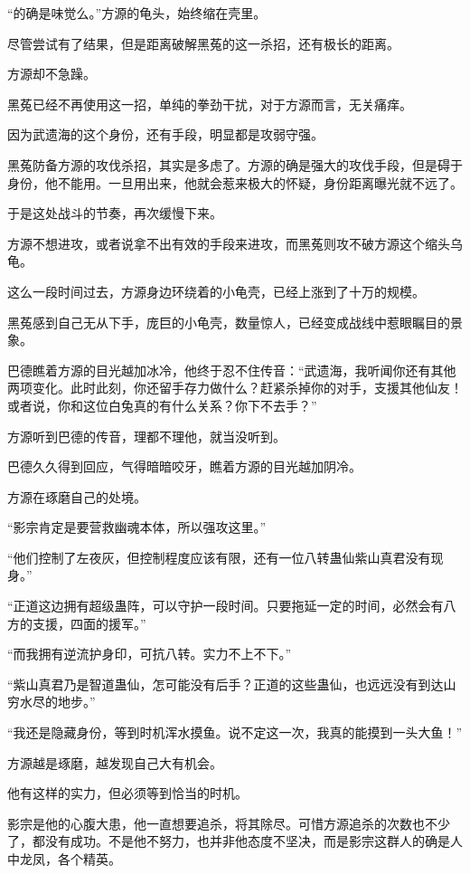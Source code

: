 \begin{this_body}
“的确是味觉么。”方源的龟头，始终缩在壳里。

尽管尝试有了结果，但是距离破解黑菟的这一杀招，还有极长的距离。

方源却不急躁。

黑菟已经不再使用这一招，单纯的拳劲干扰，对于方源而言，无关痛痒。

因为武遗海的这个身份，还有手段，明显都是攻弱守强。

黑菟防备方源的攻伐杀招，其实是多虑了。方源的确是强大的攻伐手段，但是碍于身份，他不能用。一旦用出来，他就会惹来极大的怀疑，身份距离曝光就不远了。

于是这处战斗的节奏，再次缓慢下来。

方源不想进攻，或者说拿不出有效的手段来进攻，而黑菟则攻不破方源这个缩头乌龟。

这么一段时间过去，方源身边环绕着的小龟壳，已经上涨到了十万的规模。

黑菟感到自己无从下手，庞巨的小龟壳，数量惊人，已经变成战线中惹眼瞩目的景象。

巴德瞧着方源的目光越加冰冷，他终于忍不住传音：“武遗海，我听闻你还有其他两项变化。此时此刻，你还留手存力做什么？赶紧杀掉你的对手，支援其他仙友！或者说，你和这位白兔真的有什么关系？你下不去手？”

方源听到巴德的传音，理都不理他，就当没听到。

巴德久久得到回应，气得暗暗咬牙，瞧着方源的目光越加阴冷。

方源在琢磨自己的处境。

“影宗肯定是要营救幽魂本体，所以强攻这里。”

“他们控制了左夜灰，但控制程度应该有限，还有一位八转蛊仙紫山真君没有现身。”

“正道这边拥有超级蛊阵，可以守护一段时间。只要拖延一定的时间，必然会有八方的支援，四面的援军。”

“而我拥有逆流护身印，可抗八转。实力不上不下。”

“紫山真君乃是智道蛊仙，怎可能没有后手？正道的这些蛊仙，也远远没有到达山穷水尽的地步。”

“我还是隐藏身份，等到时机浑水摸鱼。说不定这一次，我真的能摸到一头大鱼！”

方源越是琢磨，越发现自己大有机会。

他有这样的实力，但必须等到恰当的时机。

影宗是他的心腹大患，他一直想要追杀，将其除尽。可惜方源追杀的次数也不少了，都没有成功。不是他不努力，也并非他态度不坚决，而是影宗这群人的确是人中龙凤，各个精英。


\end{this_body}
